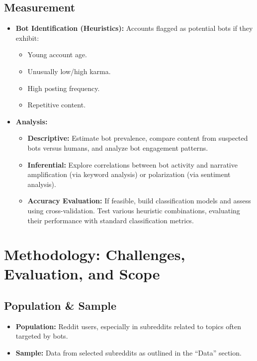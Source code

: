 \documentclass[
  letterpaper,
  DIV=11,
  numbers=noendperiod]{scrartcl}
\providecommand{\tightlist}{%
  \setlength{\itemsep}{0pt}\setlength{\parskip}{0pt}}\usepackage{longtable,booktabs,array}
\begin{document}
\subsection{Measurement}\label{measurement}

\begin{itemize}
\tightlist
\item
  \textbf{Bot Identification (Heuristics):} Accounts flagged as
  potential bots if they exhibit:

  \begin{itemize}
  \tightlist
  \item
    Young account age.
  \item
    Unusually low/high karma.
  \item
    High posting frequency.
  \item
    Repetitive content.
  \end{itemize}
\item
  \textbf{Analysis:}

  \begin{itemize}
  \tightlist
  \item
    \textbf{Descriptive:} Estimate bot prevalence, compare content from
    suspected bots versus humans, and analyze bot engagement patterns.
  \item
    \textbf{Inferential:} Explore correlations between bot activity and
    narrative amplification (via keyword analysis) or polarization (via
    sentiment analysis).
  \item
    \textbf{Accuracy Evaluation:} If feasible, build classification
    models and assess using cross-validation. Test various heuristic
    combinations, evaluating their performance with standard
    classification metrics.
  \end{itemize}
\end{itemize}

\section{Methodology: Challenges, Evaluation, and
Scope}\label{methodology-challenges-evaluation-and-scope}

\subsection{Population \& Sample}\label{population-sample}

\begin{itemize}
\tightlist
\item
  \textbf{Population:} Reddit users, especially in subreddits related to
  topics often targeted by bots.
\item
  \textbf{Sample:} Data from selected subreddits as outlined in the
  ``Data'' section.
\end{itemize}
\end{document}

